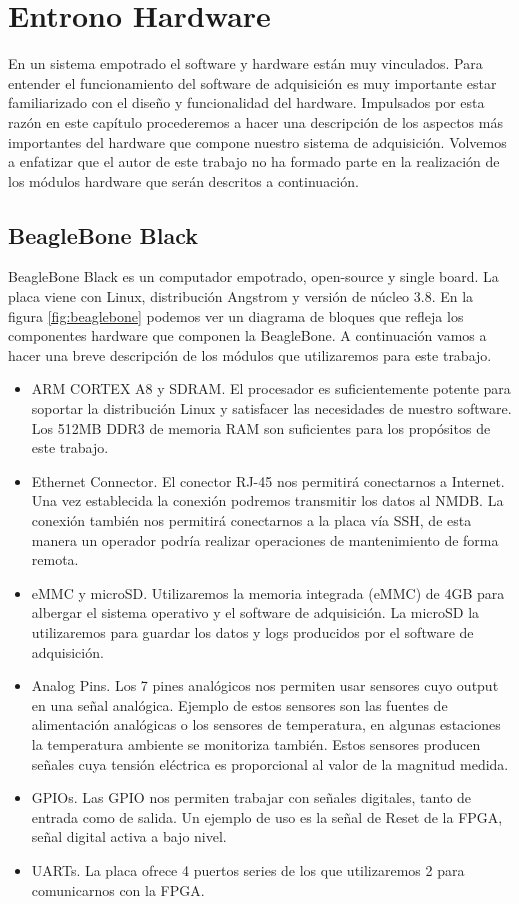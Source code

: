 \chapter{Entrono Hardware}
\label{entornoHW}

En un sistema empotrado el software y hardware están muy vinculados. Para entender el funcionamiento del software de adquisición es muy importante estar
familiarizado con el diseño y funcionalidad del hardware. Impulsados por esta razón en este capítulo procederemos a hacer una descripción de
los aspectos más importantes del hardware que compone nuestro sistema de adquisición. Volvemos a enfatizar que el autor de este trabajo no
ha formado parte  en la realización de los módulos hardware que serán descritos a continuación.
\section{BeagleBone Black}
	BeagleBone Black\cite{Beagle}\cite{BeagleWiki} es un computador empotrado, open-source y single board. La placa viene con Linux, distribución Angstrom y versión
	de núcleo 3.8. En la figura \ref{fig:beaglebone} podemos ver un diagrama de bloques que refleja los componentes hardware que componen la
	BeagleBone. A continuación vamos a hacer una breve descripción de los módulos que utilizaremos para este trabajo.
	\begin{itemize}
	  \item 	ARM CORTEX A8\cite{BeagleCore} y SDRAM. El procesador es suficientemente potente para soportar la distribución Linux y satisfacer
	    		las necesidades de nuestro software. Los 512MB DDR3 de memoria RAM son suficientes para los propósitos de este trabajo.
		\item 	Ethernet Connector. El conector RJ-45 nos permitirá conectarnos a Internet. Una vez establecida la conexión podremos transmitir
		  	los datos al NMDB. La conexión también nos permitirá conectarnos a la placa vía SSH, de esta manera un operador podría realizar
			operaciones de mantenimiento de forma remota. 
		\item	eMMC y microSD. Utilizaremos la memoria integrada (eMMC) de 4GB para albergar el sistema operativo y el software de adquisición.
		  	La microSD la utilizaremos para guardar los datos y logs producidos por el software de adquisición.
		\item 	Analog Pins. Los 7 pines analógicos nos permiten usar sensores cuyo output en una señal analógica. Ejemplo de estos sensores son
		  	las fuentes de alimentación analógicas o los sensores de temperatura, en algunas estaciones la temperatura ambiente se monitoriza
			también. Estos sensores producen señales cuya tensión eléctrica es proporcional al valor de la magnitud medida. 
		\item 	GPIOs. Las GPIO nos permiten trabajar con señales digitales, tanto de entrada como de salida. Un ejemplo de uso es la señal de
		  	Reset de la FPGA, señal digital activa a bajo nivel.
		\item	UARTs. La placa ofrece 4 puertos series de los que utilizaremos 2 para comunicarnos con la FPGA.
	\end{itemize}
